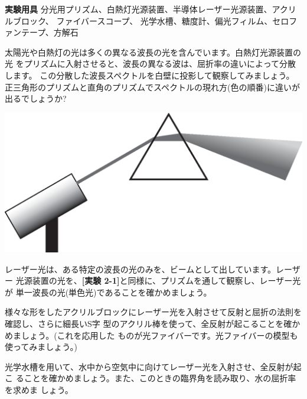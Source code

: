\newpage

\jikken

\begin{itemsquarebox}[c]{\bf 実験用具}
分光用プリズム、白熱灯光源装置、半導体レーザー光源装置、アクリルブロック、
ファイバースコープ、
光学水槽、糖度計、偏光フィルム、セロファンテープ、方解石
\end{itemsquarebox}

\bigskip


太陽光や白熱灯の光は多くの異なる波長の光を含んでいます。白熱灯光源装置の光
をプリズムに入射させると、波長の異なる波は、屈折率の違いによって分散します。
この分散した波長スペクトルを白壁に投影して観察してみましょう。
正三角形のプリズムと直角のプリズムでスペクトルの現れ方(色の順番)に違いが出るでしょうか?
\begin{center}
\includegraphics[scale=0.4]{02_Refraction/prism.eps}
\end{center}



レーザー光は、ある特定の波長の光のみを、ビームとして出しています。レーザー
光源装置の光を、{\bf [実験 2-1]}と同様に、プリズムを通して観察し、レーザー光が
単一波長の光(単色光)であることを確かめましょう。

\bigskip


様々な形をしたアクリルブロックにレーザー光を入射させて反射と屈折の法則を確認し、さらに細長いS字
型のアクリル棒を使って、全反射が起こることを確かめましょう。(これを応用した
ものが光ファイバーです。光ファイバーの模型も使ってみましょう。)

\bigskip



光学水槽を用いて、水中から空気中に向けてレーザー光を入射させ、全反射が起こ
ることを確かめましょう。また、このときの臨界角を読み取り、水の屈折率を求めま
しょう。

